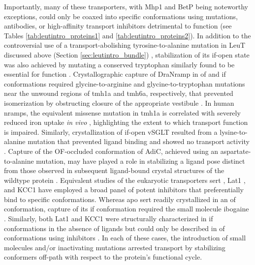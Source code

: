 Importantly, many of these transporters, with Mhp1 and BetP being noteworthy exceptions, could only be coaxed into specific conformations using mutations, antibodies, or high-affinity transport inhibitors detrimental to function (see Tables \ref{tab:leutintro_proteins1} and \ref{tab:leutintro_proteins2}). In addition to the controversial use of a transport-abolishing tyrosine-to-alanine mutation in LeuT discussed above (Section \ref{sec:leutintro_bundle}) \citep*{Krishnamurthy2012}, stabilization of its \gls{if}-open state was also achieved by mutating a conserved tryptophan similarly found to be essential for function \citep*{Gotfryd2020}. Crystallographic capture of DraNramp in \gls{of} and \gls{if} conformations required glycine-to-arginine and glycine-to-tryptophan mutations near the unwound regions of \gls{tmh}1a and \gls{tmh}6a, respectively, that prevented isomerization by obstructing closure of the appropriate vestibule \citep*{Bozzi2016, Bozzi2019}. In human \gls{nramp}s, the equivalent missense mutation in \gls{tmh}1a is correlated with severely reduced iron uptake \emph{in vivo} \citep*{Barrios2012}, highlighting the extent to which transport function is impaired. Similarly, crystallization of \gls{if}-open vSGLT resulted from a lysine-to-alanine mutation that prevented ligand binding and showed no transport activity \citep*{Watanabe2010}. Capture of the OF-occluded conformation of AdiC, achieved using an aspartate-to-alanine mutation, may have played a role in stabilizing a ligand pose distinct from those observed in subsequent ligand-bound crystal structures of the wildtype protein \citep*{Gao2009}. Equivalent studies of the eukaryotic transporters \gls{sert} \citep*{Coleman2019}, Lat1 \citep*{Yan2021}, and KCC1 \citep*{Zhao2020} have employed a broad panel of potent inhibitors that preferentially bind to specific conformations. Whereas apo \gls{sert} readily crystallized in an \gls{of} conformation, capture of its \gls{if} conformation required the small molecule ibogaine \citep*{Coleman2019}. Similarly, both Lat1 and KCC1 were structurally characterized in \gls{if} conformations in the absence of ligands \citep*{Lee2019, Liu2019, Xie2020, Yan2020a} but could only be described in \gls{of} conformations using inhibitors \citep*{Yan2021, Zhao2020}. In each of these cases, the introduction of small molecules and/or inactivating mutations arrested transport by stabilizing conformers off-path with respect to the protein's functional cycle.

